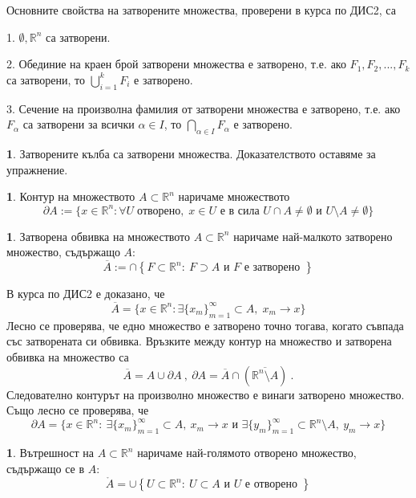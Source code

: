 \documentclass[11pt]{article}
\numberwithin{equation}{section}
\numberwithin{figure}{section}
\numberwithin{table}{section}
\theoremstyle{plain}
\theoremstyle{definition}
\newtheorem{defn}[thm]{\protect\definitionname}
\theoremstyle{remark}
\theoremstyle{definition}
\theoremstyle{remark}
\theoremstyle{plain}
\theoremstyle{definition}
\theoremstyle{definition}
\newtheorem{example}[thm]{\protect\examplename}
\theoremstyle{plain}
\theoremstyle{plain}
\theoremstyle{plain}
\theoremstyle{definition}
\theoremstyle{plain}
\providecommand{\definitionname}{Дефиниция}
\providecommand{\examplename}{Пример}
\newcommand*{\R}{\mathbb{R}}
\begin{document}
Основните свойства на затворените множества, проверени в курса по ДИС2, са

1. $\emptyset, \R^n$ са затворени.

2. Обединие на краен брой затворени множества е затворено, т.е. ако $F_1, F_2, ..., F_k$ са затворени, то $\bigcup_{i=1}^k F_i$ е затворено.

3. Сечение на произволна фамилия от затворени множества е затворено, т.е. ако $F_\alpha$ са затворени за всички $\alpha \in I$, то $\bigcap _{\alpha \in I} F_\alpha$ е затворено.

\begin{example}
Затворените кълба са затворени множества. Доказателството оставяме за упражнение.
\end{example}

\begin{defn}
Контур на множеството $A \subset \R^n$ наричаме множеството
$$\partial A := \{ x\in \R^n : \forall U \; \text{отворено}, \; x\in U \mbox{ е в сила } U \cap A \neq \emptyset \mbox{ и } U\setminus A \neq \emptyset \}$$
\end{defn}

\begin{defn}
Затворена обвивка на множеството $A \subset \R^n$ наричаме най-малкото затворено множество, съдържащо $A$:
$$\overline{A} := \cap \left\{ F \subset \R^n : \ F \supset A  \mbox{ и } F  \mbox{ е затворено }\right\}$$
\end{defn}

В курса по ДИС2 е доказано, че
$$\overline{A} = \{x\in\R^n: \exists \{x_m\}_{m=1}^\infty \subset A,\; x_m \rightarrow x \}$$
Лесно се проверява, че едно множество е затворено точно тогава, когато съвпада със затворената си обвивка. Връзките между контур на множество и затворена обвивка на множество са
$$\overline{A}= A \cup \partial A \ , \ \partial A =\overline{A} \cap \left(\overline{\R^n\setminus A}\right) \ .$$
Следователно контурът на произволно множество е винаги затворено множество. Също лесно се проверява, че
$$\partial A = \{x \in \R^n : \ \exists \{x_m\}_{m=1}^\infty \subset A, \ x_m \rightarrow x  \mbox{ и } \exists \{y_m\}_{m=1}^\infty \subset \R^n\setminus A, \  y_m \rightarrow x\}$$

\begin{defn}
Вътрешност на $A\subset\R^n$ наричаме най-голямото отворено множество, съдържащо се в $A$:
$$\mathring{A} = \cup \left\{ U \subset \R^n : \ U \subset A  \mbox{ и } U  \mbox{ е отворено }\right\}$$
\end{defn}
\end{document}
